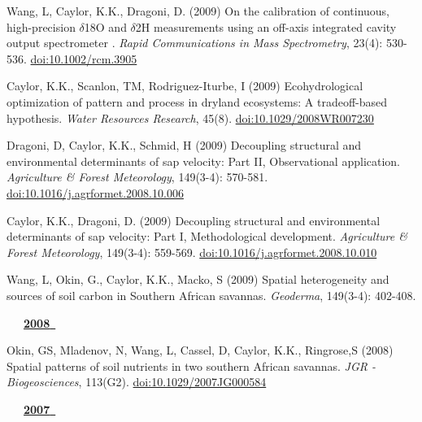 \begin{etaremune}
\item Wang, L, Caylor, K.K., Dragoni, D. (2009) On the calibration of continuous, high-precision $\delta$18O and $\delta$2H measurements using an off-axis integrated cavity output spectrometer . \emph{Rapid Communications in Mass Spectrometry}, 23(4): 530-536. \href{https://doi.org/10.1002/rcm.3905}{doi:10.1002/rcm.3905}
\item Caylor, K.K., Scanlon, TM, Rodriguez-Iturbe, I (2009) Ecohydrological optimization of pattern and process in dryland ecosystems: A tradeoff-based hypothesis. \emph{Water Resources Research}, 45(8). \href{https://doi.org/10.1029/2008WR007230}{doi:10.1029/2008WR007230}
\item Dragoni, D, Caylor, K.K., Schmid, H (2009) Decoupling structural and environmental determinants of sap velocity: Part II, Observational application. \emph{Agriculture \& Forest Meteorology}, 149(3-4): 570-581. \href{https://doi.org/10.1016/j.agrformet.2008.10.006}{doi:10.1016/j.agrformet.2008.10.006}
\item Caylor, K.K., Dragoni, D. (2009) Decoupling structural and environmental determinants of sap velocity: Part I, Methodological development. \emph{Agriculture \& Forest Meteorology}, 149(3-4): 559-569. \href{https://doi.org/10.1016/j.agrformet.2008.10.010}{doi:10.1016/j.agrformet.2008.10.010}
\item Wang, L, Okin, G., Caylor, K.K., Macko, S (2009) Spatial heterogeneity and sources of soil carbon in Southern African savannas. \emph{Geoderma}, 149(3-4): 402-408. 

\mbox{\ \ \ \underline{\textbf{2008 }}}

\item Okin, GS, Mladenov, N, Wang, L, Cassel, D, Caylor, K.K., Ringrose,S (2008) Spatial patterns of soil nutrients in two southern African savannas. \emph{JGR - Biogeosciences}, 113(G2). \href{https://doi.org/10.1029/2007JG000584}{doi:10.1029/2007JG000584}

\mbox{\ \ \ \underline{\textbf{2007 }}}


\end{etaremune}
